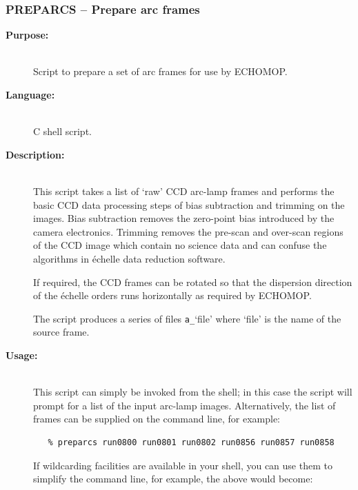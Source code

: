 \documentclass[twoside,11pt]{article}
\newcommand{\stardocinitials}  {SC}
\newcommand{\stardocnumber}    {3.2-0} %
\newcommand{\stardocname}{\stardocinitials /\stardocnumber}
\newcommand{\xref}[3]{#1}
\newcommand{\xlabel}[1]{}
\renewcommand{\_}{\texttt{\symbol{95}}}
\newcommand{\scspec}[2]{#1}
\newcommand{\scspec}[2]{#2}
\begin{document}
\newpage
\subsubsection{\label{se_preparcs}\xlabel{preparcs}PREPARCS
                \scspec{--}{-} Prepare arc frames}
\markboth{PREPARCS}{\stardocname}

\begin{description}

\item [{\bf Purpose:}] \mbox{} \\
     Script to prepare a set of arc frames for use by
     \xref{ECHOMOP}{sun152}{}.

\item [{\bf Language:}] \mbox{} \\
     C shell script.

\item [{\bf Description:}] \mbox{} \\
     This script takes a list of `raw' CCD arc-lamp frames and performs
     the basic CCD data processing steps of bias subtraction and trimming
     on the images.  Bias subtraction removes the zero-point bias
     introduced by the camera electronics.  Trimming removes the pre-scan
     and over-scan regions of the CCD image which contain no science data
     and can confuse the algorithms in \'{e}chelle data reduction software.

     If required, the CCD frames can be rotated so that the dispersion
     direction of the \'{e}chelle orders runs horizontally as required by
     ECHOMOP.

     The script produces a series of files \verb+a_+`file' where `file'
     is the name of the source frame.

\item [{\bf Usage:}] \mbox{} \\
     This script can simply be invoked from the shell; in this case
     the script will prompt for a list of the input arc-lamp images.
     Alternatively, the list of frames can be supplied on the
     command line, for example:

\begin{verbatim}
   % preparcs run0800 run0801 run0802 run0856 run0857 run0858
\end{verbatim}

     If wildcarding facilities are available in your shell, you can use
     them to simplify the command line, for example, the above would
     become:


\end{description}
\end{document}
